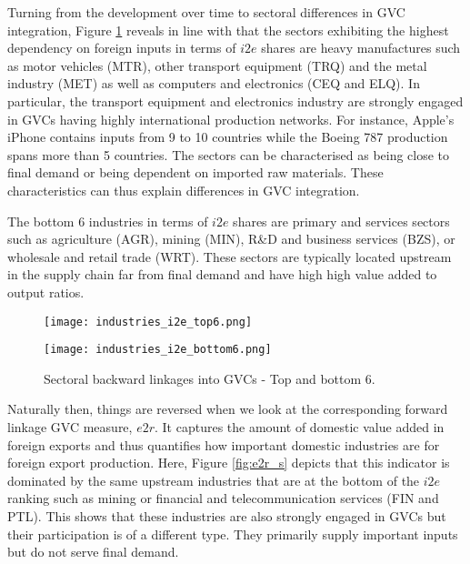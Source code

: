 \documentclass[11pt,a4paper]{article}
\begin{document}
Turning from the development over time to sectoral differences in GVC integration, Figure \ref{fig:i2e_s} reveals in line with \citet{rojoguno12a} that the sectors exhibiting the highest dependency on foreign inputs in terms of $i2e$ shares are heavy manufactures such as motor vehicles (MTR), other transport equipment (TRQ) and the metal industry (MET) as well as computers and electronics (CEQ and ELQ). In particular, the transport equipment and electronics industry are strongly engaged in GVCs having highly international production networks. For instance, Apple's iPhone contains inputs from 9 to 10 countries while the Boeing 787 production spans more than 5 countries. The sectors can be characterised as being close to final demand or being dependent on imported raw materials. These characteristics can thus explain differences in GVC integration.

The bottom 6 industries in terms of $i2e$ shares are primary and services sectors such as agriculture (AGR), mining (MIN), R\&D and business services (BZS), or wholesale and retail trade (WRT). These sectors are typically located upstream in the supply chain far from final demand and have high high value added to output ratios.

\begin{figure}
\centering
\begin{minipage}{0.45\textwidth}
\centering
\texttt{[image: industries\_i2e\_top6.png]}
\end{minipage}\hfill
\begin{minipage}{0.45\textwidth}
\centering
\texttt{[image: industries\_i2e\_bottom6.png]}
\end{minipage}
\caption{Sectoral backward linkages into GVCs - Top and bottom 6.}
\label{fig:i2e_s}
\end{figure}

Naturally then, things are reversed when we look at the corresponding forward linkage GVC measure, $e2r$. It captures the amount of domestic value added in foreign exports and thus quantifies how important domestic industries are for foreign export production. Here, Figure \ref{fig:e2r_s} depicts that this indicator is dominated by the same upstream industries that are at the bottom of the $i2e$ ranking such as mining or financial and telecommunication services (FIN and PTL). This shows that these industries are also strongly engaged in GVCs but their participation is of a different type. They primarily supply important inputs but do not serve final demand. 
\end{document}
